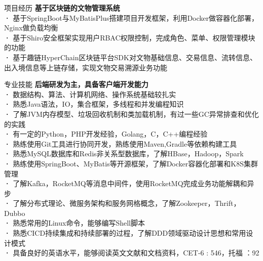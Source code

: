 \documentclass{resume} %
\begin{document}
\begin{rSection}{项目经历}
{\bf 基于区块链的文物管理系统}\\
\textbf{·} 基于SpringBoot与MyBatisPlus搭建项目开发框架，利用Docker做容器化部署，Nginx做负载均衡\\
\textbf{·} 基于Shiro安全框架实现用户RBAC权限控制，完成角色、菜单、权限管理模块的功能\\
\textbf{·} 基于趣链HyperChain区块链平台SDK对文物基础信息、交易信息、流转信息、出入境信息等上链存储，实现文物交易溯源业务功能

\end{rSection}

\begin{rSection}{专业技能}
{\bf 后端研发为主，具备客户端开发能力}\\
\textbf{·} 数据结构、算法、计算机网络、操作系统基础较扎实\\
\textbf{·} 熟悉Java语法，IO，集合框架，多线程和并发编程知识\\
\textbf{·} 了解JVM内存模型、垃圾回收机制和类加载机制，有过一些GC异常排查和优化的实践\\
\textbf{·} 有一定的Python，PHP开发经验，Golang，C，C++编程经验\\
\textbf{·} 熟练使⽤Git⼯具进⾏协同开发，熟练使⽤Maven,Gradle等依赖构建⼯具\\ \textbf{·} 熟悉MySQL数据库和Redis⾮关系型数据库，了解HBase，Hadoop，Spark\\
\textbf{·} 熟练使⽤SpringBoot、MyBatis等开源框架，了解Docker容器化部署和K8S集群管理\\ 
\textbf{·} 了解Kafka，RocketMQ等消息中间件，使用RocketMQ完成业务功能解耦和异步\\
\textbf{·} 了解分布式理论、微服务架构和服务网格概念，了解Zookeeper，Thrift，Dubbo\\ 
\textbf{·} 熟悉常⽤的Linux命令，能够编写Shell脚本\\ 
\textbf{·} 熟悉CICD持续集成和持续部署的过程，了解DDD领域驱动设计思想和常用设计模式\\ 
\textbf{·} 具备良好的英语⽔平，能够阅读英文文献和文档资料，CET-6 : 546，托福 ：92


\end{rSection}
\end{document}
